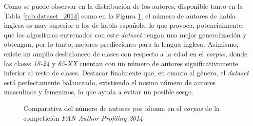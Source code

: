 \bigskip
Como se puede observar en la distribución de los autores, disponible tanto en la Tabla \ref{tab:dataset_2014} como en la Figura \ref{fig:dataset_2014}, el número de autores de habla inglesa
es muy superior a los de habla española, lo que provoca, potencialmente, que los algoritmos entrenados con este \textit{dataset} tengan una mejor generalización y obtengan, por lo tanto,
mejores predicciones para la lengua inglesa. Asimismo, existe un amplio desbalanceo de clases con respecto a la edad en el \textit{corpus},
donde las clases \textit{18-24} y \textit{65-XX} cuentan con un número de autores significativamente inferior al resto de clases. Destacar finalmente que,
en cuanto al género, el \textit{dataset} está perfectamente balanceado, existiendo el mismo número de autores masculinos y femeninos, lo que
ayuda a evitar un posible sesgo.

\bigskip
\begin{figure}[H]
	\centering
	\caption{Comparativa del número de autores por idioma en el \textit{corpus} de la competición \textit{PAN Author Profiling 2014}}
	\label{fig:dataset_2014}
\end{figure}

